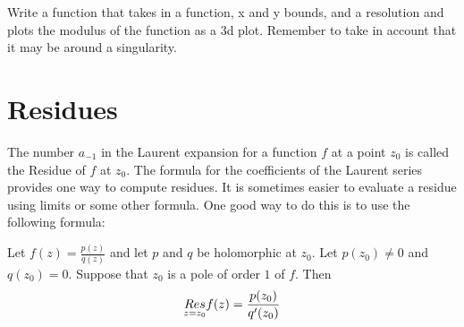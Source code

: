 \begin{problem}
Write a function that takes in a function, x and y bounds, and a resolution and plots the modulus of the function as a 3d plot. Remember to take in account that it may be around a singularity.
\end{problem} 

\section*{Residues}
The number $a_{-1}$ in the Laurent expansion for a function $f$ at a point $z_0$ is called the Residue of $f$ at $z_0$.
The formula for the coefficients of the Laurent series provides one way to compute residues.
It is sometimes easier to evaluate a residue using limits or some other formula.
One good way to do this is to use the following formula:

Let $f(z)=\frac{p(z)}{q(z)}$ and let $p$ and $q$ be holomorphic at $z_0$. Let $p(z_0) \neq 0$ and $q(z_0)=0$.
Suppose that $z_0$ is a pole of order $1$ of $f$.
Then
\[\underset{z=z_0}{Res} f(z) = \frac{p(z_0)}{q'(z_0)}\]

